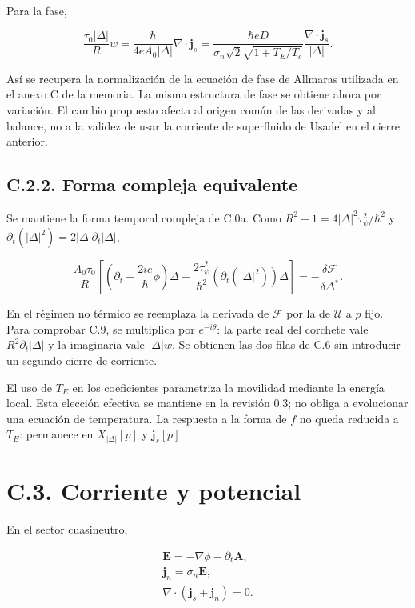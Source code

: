 \documentclass[
  spanish,
  10pt,
  a4paper,
]{article}
\begin{document}
Para la fase,

\[
\frac{\tau_0|\Delta|}{R}w=\frac\hbar{4eA_0|\Delta|}\nabla\cdot\mathbf j_s
=\frac{\hbar eD}{\sigma_n\sqrt2\sqrt{1+T_E/T_c}}
\frac{\nabla\cdot\mathbf j_s}{|\Delta|}. \tag{C.8}
\]

Así se recupera la normalización de la ecuación de fase de Allmaras
utilizada en el anexo C de la memoria. La misma estructura de fase se
obtiene ahora por variación. El cambio propuesto afecta al origen común
de las derivadas y al balance, no a la validez de usar la corriente de
superfluido de Usadel en el cierre anterior.

\subsection{C.2.2. Forma compleja
equivalente}\label{c.2.2.-forma-compleja-equivalente}

Se mantiene la forma temporal compleja de C.0a. Como
\(R^2-1=4|\Delta|^2\tau_\psi^2/\hbar^2\) y
\(\partial_t(|\Delta|^2)=2|\Delta|\partial_t|\Delta|\),

\[
\frac{A_0\tau_0}{R}\left[
\left(\partial_t+\frac{2ie}{\hbar}\phi\right)\Delta
+\frac{2\tau_\psi^2}{\hbar^2}(\partial_t(|\Delta|^2))\Delta\right]
=-\frac{\delta\mathcal F}{\delta\Delta^*}. \tag{C.9}
\]

En el régimen no térmico se reemplaza la derivada de \(\mathcal F\) por
la de \(\mathcal U\) a \(p\) fijo. Para comprobar C.9, se multiplica por
\(e^{-i\theta}\): la parte real del corchete vale
\(R^2\partial_t|\Delta|\) y la imaginaria vale \(|\Delta|w\). Se
obtienen las dos filas de C.6 sin introducir un segundo cierre de
corriente.

El uso de \(T_E\) en los coeficientes parametriza la movilidad mediante
la energía local. Esta elección efectiva se mantiene en la revisión 0.3;
no obliga a evolucionar una ecuación de temperatura. La respuesta a la
forma de \(f\) no queda reducida a \(T_E\): permanece en
\(X_{|\Delta|}[p]\) y \(\mathbf j_s[p]\).

\section{C.3. Corriente y potencial}\label{c.3.-corriente-y-potencial}

En el sector cuasineutro,

\[
\begin{gathered}
\mathbf E=-\nabla\phi-\partial_t\mathbf A,\\
\mathbf j_n=\sigma_n\mathbf E,\\
\nabla\cdot(\mathbf j_s+\mathbf j_n)=0.
\end{gathered} \tag{C.10}
\]
\end{document}
